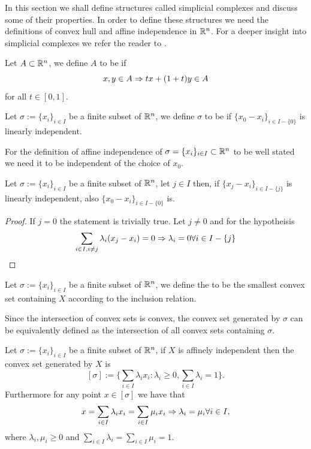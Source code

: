 \documentclass[../1.tex]{subfiles}
\begin{document}
    In this section we shall define structures called simplicial complexes and discuss some of their properties. In order to define these structures
    we need the definitions of convex hull and affine independence in $\mathbb{R}^n$. For a deeper insight into simplicial complexes we refer the reader to 
    \cite{singerthorpe,rotman}.    

    \begin{defn}
        Let $A \subset \mathbb{R}^n$, we define $A$ to be  if
        \[ x,y \in A \Rightarrow tx + (1+t)y \in A \]
        for all $t \in [0,1]$.
    \end{defn}

    \begin{defn}
        Let $\sigma := \{x_i\}_{i \in I}$ be a finite subset of $\mathbb{R}^n$, we define $\sigma$ to be  if 
        $\{ x_0 - x_i\}_{i \in I - \{0\}}$ is linearly independent.
    \end{defn}

    For the definition of affine independence of $\sigma = \{x_i\}_{i \in I} \subset \mathbb{R}^n$ to be well stated we need it to be independent of the choice of $x_0$.
      
    \begin{prop}
        Let $\sigma := \{x_i\}_{i \in I}$ be a finite subset of $\mathbb{R}^n$, let $j \in I$ then, if $\{ x_j - x_i\}_{i \in I-\{j\}}$ is linearly independent,
        also $\{ x_0 - x_i\}_{i \in I-\{0\}}$ is. 
    \end{prop}
    \begin{proof}
        If $j=0$ the statement is trivially true. Let $j \neq 0$ and for the hypotheisis
        \[ \sum_{i \in I, i \neq j} \lambda_i (x_j - x_i) = 0 \Rightarrow \lambda_i = 0 \forall i \in I-\{j\}\]
    \end{proof}

    \begin{defn}
        Let $\sigma := \{x_i\}_{i \in I}$ be a finite subset of $\mathbb{R}^n$, we define the  to be 
        the smallest convex set containing $X$ according to the inclusion relation.
    \end{defn}

    Since the intersection of convex sets is convex, the convex set generated by $\sigma$ can be equivalently defined as the intersection 
    of all convex sets containing $\sigma$.

    \begin{thm}
        Let $\sigma := \{x_i\}_{i \in I}$ be a finite subset of $\mathbb{R}^n$, if $X$ is affinely independent then the convex set generated by $X$ is 
        \[ [\sigma] := \{ \sum_{i \in I} \lambda_i x_i : \lambda_i \geq 0, \sum_{i \in I} \lambda_i = 1\}. \]
        Furthermore for any point $x \in [\sigma]$ we have that
        \[ x = \sum_{i \in I} \lambda_i x_i = \sum_{i \in I} \mu_i x_i \Rightarrow \lambda_i = \mu_i \forall i \in I, \] 
        where $\lambda_i,\mu_i \geq 0$ and $\sum_{i \in I} \lambda_i = \sum_{i \in I} \mu_i =1$.
        \label{thm:1}
    \end{thm}
\end{document}
